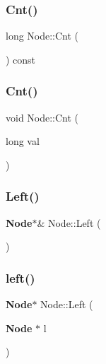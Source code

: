 \subsubsection{Cnt()\hspace{0.1cm}{\footnotesize\ttfamily [1/2]}}
{\footnotesize\ttfamily long Node\+::\+Cnt (\begin{DoxyParamCaption}{ }\end{DoxyParamCaption}) const\hspace{0.3cm}{\ttfamily [inline]}}

\mbox{\label{class_node_a7a2fced8d12d4f75acb8a24fbd0467e2}} 
\subsubsection{Cnt()\hspace{0.1cm}{\footnotesize\ttfamily [2/2]}}
{\footnotesize\ttfamily void Node\+::\+Cnt (\begin{DoxyParamCaption}\item[{long}]{val }\end{DoxyParamCaption})\hspace{0.3cm}{\ttfamily [inline]}}

\mbox{\label{class_node_a4b0ea9be15925bfa877cdac6923c275a}} 
\subsubsection{Left()\hspace{0.1cm}{\footnotesize\ttfamily [1/2]}}
{\footnotesize\ttfamily \textbf{ Node}$\ast$\& Node\+::\+Left (\begin{DoxyParamCaption}{ }\end{DoxyParamCaption})\hspace{0.3cm}{\ttfamily [inline]}}

\mbox{\label{class_node_af62ccd86ec2c1967b571faf948a964c4}} 
\subsubsection{left()\hspace{0.1cm}{\footnotesize\ttfamily [2/2]}}
{\footnotesize\ttfamily \textbf{ Node}$\ast$ Node\+::\+Left (\begin{DoxyParamCaption}\item[{\textbf{ Node} $\ast$}]{l }\end{DoxyParamCaption})\hspace{0.3cm}{\ttfamily [inline]}}

